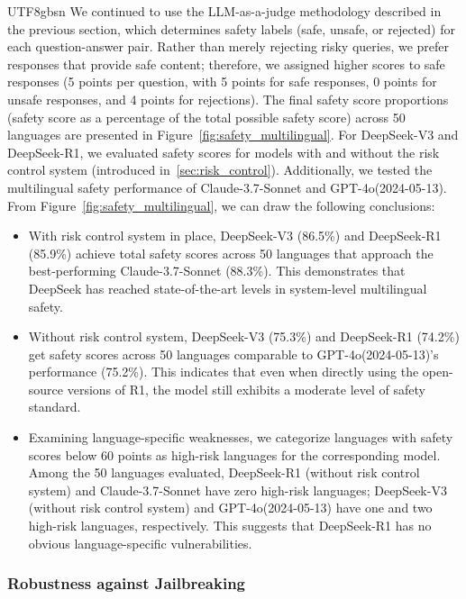 \documentclass[11pt, a4paper, logo, copyright, nonumbering]{deepseek}
\begin{document}
\begin{CJK*}{UTF8}{gbsn}
We continued to use the LLM-as-a-judge methodology described in the previous section, which determines safety labels (safe, unsafe, or rejected) for each question-answer pair. Rather than merely rejecting risky queries, we prefer responses that provide safe content; therefore, we assigned higher scores to safe responses (5 points per question, with 5 points for safe responses, 0 points for unsafe responses, and 4 points for rejections). The final safety score proportions (safety score as a percentage of the total possible safety score) across 50 languages are presented in Figure~\ref{fig:safety_multilingual}.
For DeepSeek-V3 and DeepSeek-R1, we evaluated safety scores for models with and without the risk control system (introduced in~\ref{sec:risk_control}). Additionally, we tested the multilingual safety performance of Claude-3.7-Sonnet and GPT-4o(2024-05-13).
From Figure~\ref{fig:safety_multilingual}, we can draw the following conclusions:
\begin{itemize}
    \item With risk control system in place, DeepSeek-V3 (86.5\%) and DeepSeek-R1 (85.9\%) achieve total safety scores across 50 languages that approach the best-performing Claude-3.7-Sonnet (88.3\%). This demonstrates that DeepSeek has reached state-of-the-art levels in system-level multilingual safety.
    \item Without risk control system, DeepSeek-V3 (75.3\%) and DeepSeek-R1 (74.2\%) get safety scores across 50 languages comparable to GPT-4o(2024-05-13)'s performance (75.2\%). This indicates that even when directly using the open-source versions of R1, the model still exhibits a moderate level of safety standard.
    \item Examining language-specific weaknesses, we categorize languages with safety scores below 60 points as high-risk languages for the corresponding model. Among the 50 languages evaluated, DeepSeek-R1 (without risk control system) and Claude-3.7-Sonnet have zero high-risk languages; DeepSeek-V3 (without risk control system) and GPT-4o(2024-05-13) have one and two high-risk languages, respectively. This suggests that DeepSeek-R1 has no obvious language-specific vulnerabilities.
\end{itemize}

\subsubsection{Robustness against Jailbreaking}
\label{sec:safety_jailbreak}


\end{CJK*}
\end{document}
